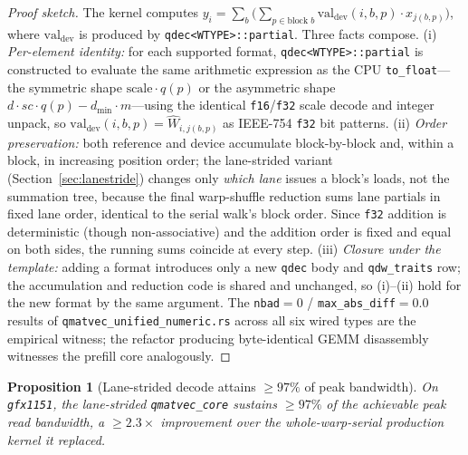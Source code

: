 \documentclass[11pt]{article}
\newtheorem{proposition}{Proposition}
\begin{document}
\begin{proof}[Proof sketch]
The kernel computes $y_i = \sum_{b} \big(\sum_{p \in \text{block }b} \mathrm{val}_{\text{dev}}(i,b,p)\cdot x_{j(b,p)}\big)$, where $\mathrm{val}_{\text{dev}}$ is produced by \texttt{qdec<WTYPE>::partial}. Three facts compose. (i) \emph{Per-element identity:} for each supported format, \texttt{qdec<WTYPE>::partial} is constructed to evaluate the same arithmetic expression as the CPU \texttt{to\_float}---the symmetric shape $\text{scale}\cdot q(p)$ or the asymmetric shape $d\cdot sc\cdot q(p)-d_{\min}\cdot m$---using the identical \texttt{f16}/\texttt{f32} scale decode and integer unpack, so $\mathrm{val}_{\text{dev}}(i,b,p)=\hat W_{i,j(b,p)}$ as IEEE-754 \texttt{f32} bit patterns. (ii) \emph{Order preservation:} both reference and device accumulate block-by-block and, within a block, in increasing position order; the lane-strided variant (Section~\ref{sec:lanestride}) changes only \emph{which lane} issues a block's loads, not the summation tree, because the final warp-shuffle reduction sums lane partials in fixed lane order, identical to the serial walk's block order. Since \texttt{f32} addition is deterministic (though non-associative) and the addition order is fixed and equal on both sides, the running sums coincide at every step. (iii) \emph{Closure under the template:} adding a format introduces only a new \texttt{qdec} body and \texttt{qdw\_traits} row; the accumulation and reduction code is shared and unchanged, so (i)--(ii) hold for the new format by the same argument. The \texttt{nbad}$=0$ / \texttt{max\_abs\_diff}$=0.0$ results of \texttt{qmatvec\_unified\_numeric.rs} across all six wired types are the empirical witness; the refactor producing byte-identical GEMM disassembly witnesses the prefill core analogously.
\end{proof}

\begin{proposition}[Lane-strided decode attains $\geq 97\%$ of peak bandwidth]
\label{prop:lane}
On \texttt{gfx1151}, the lane-strided \texttt{qmatvec\_core} sustains $\geq 97\%$ of the achievable peak read bandwidth, a $\geq 2.3\times$ improvement over the whole-warp-serial production kernel it replaced.
\end{proposition}
\end{document}
